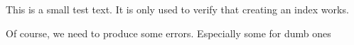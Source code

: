 \documentclass[a4paper,fleqn]{article}
\begin{document}
This is a small test text. It is only used to verify that creating an index
works.

Of course, we need to produce some errors.
Especially some for dumb ones

\printindex
\end{document}
